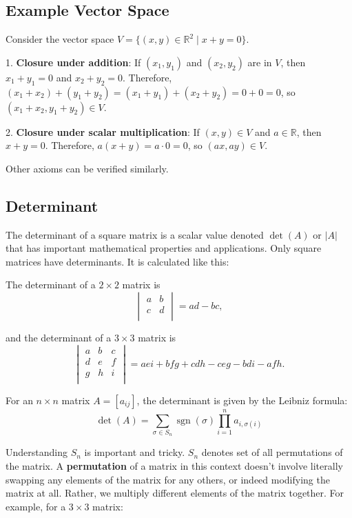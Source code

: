 \documentclass[12pt]{article}
\begin{document}
\subsection{Example Vector Space}
Consider the vector space \(V = \{(x, y) \in \mathbb{R}^2 \mid x + y = 0\}\).

1. \textbf{Closure under addition}: If \((x_1, y_1)\) and \((x_2, y_2)\) are in \(V\), then \(x_1 + y_1 = 0\) and \(x_2 + y_2 = 0\). Therefore, \((x_1 + x_2) + (y_1 + y_2) = (x_1 + y_1) + (x_2 + y_2) = 0 + 0 = 0\), so \((x_1 + x_2, y_1 + y_2) \in V\).

2. \textbf{Closure under scalar multiplication}: If \((x, y) \in V\) and \(a \in \mathbb{R}\), then \(x + y = 0\). Therefore, \(a(x + y) = a \cdot 0 = 0\), so \((ax, ay) \in V\).

Other axioms can be verified similarly.

\subsection{Determinant}
The determinant of a square matrix is a scalar value denoted \( \det(A) \) or \( |A| \) that has important mathematical properties and applications. Only square matrices have determinants. It is calculated like this: 

The determinant of a \( 2 \times 2 \) matrix is
\[
\begin{vmatrix}
a & b \\
c & d \\
\end{vmatrix}
= ad - bc,
\]

and the determinant of a \( 3 \times 3 \) matrix is
\[
\begin{vmatrix}
a & b & c \\
d & e & f \\
g & h & i \\
\end{vmatrix}
= aei + bfg + cdh - ceg - bdi - afh.
\]

For an \( n \times n \) matrix \( A = [a_{ij}] \), the determinant is given by the Leibniz formula:
\[
\det(A) = \sum_{\sigma \in S_n} \operatorname{sgn}(\sigma) \prod_{i=1}^{n} a_{i, \sigma(i)}
\]

Understanding \( S_n \) is important and tricky.  \( S_n \) denotes set of all permutations of the matrix. A \textbf{permutation} of a matrix in this context doesn't involve literally swapping any elements of the matrix for any others, or indeed modifying the matrix at all. Rather, we multiply different elements of the matrix together. For example, for a \( 3 \times 3 \) matrix:
\end{document}
